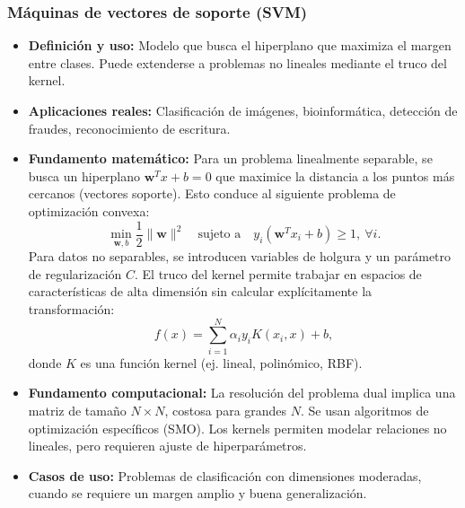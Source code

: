 \documentclass[12pt,a4paper,openany,oneside]{book}
\begin{document}
\subsubsection{Máquinas de vectores de soporte (SVM)}
\begin{itemize}
    \item \textbf{Definición y uso:} Modelo que busca el hiperplano que maximiza el margen entre clases. Puede extenderse a problemas no lineales mediante el truco del kernel.
    \item \textbf{Aplicaciones reales:} Clasificación de imágenes, bioinformática, detección de fraudes, reconocimiento de escritura.
    \item \textbf{Fundamento matemático:} Para un problema linealmente separable, se busca un hiperplano \(\mathbf{w}^T x + b = 0\) que maximice la distancia a los puntos más cercanos (vectores soporte). Esto conduce al siguiente problema de optimización convexa:
    \[
    \min_{\mathbf{w}, b} \frac{1}{2} \|\mathbf{w}\|^2 \quad \text{sujeto a} \quad y_i(\mathbf{w}^T x_i + b) \ge 1, \ \forall i.
    \]
    Para datos no separables, se introducen variables de holgura y un parámetro de regularización \(C\). El truco del kernel permite trabajar en espacios de características de alta dimensión sin calcular explícitamente la transformación:
    \[
    f(x) = \sum_{i=1}^N \alpha_i y_i K(x_i, x) + b,
    \]
    donde \(K\) es una función kernel (ej. lineal, polinómico, RBF).
    \item \textbf{Fundamento computacional:} La resolución del problema dual implica una matriz de tamaño \(N \times N\), costosa para grandes \(N\). Se usan algoritmos de optimización específicos (SMO). Los kernels permiten modelar relaciones no lineales, pero requieren ajuste de hiperparámetros.
    \item \textbf{Casos de uso:} Problemas de clasificación con dimensiones moderadas, cuando se requiere un margen amplio y buena generalización.
\end{itemize}
\end{document}
